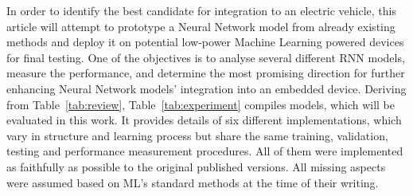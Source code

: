%
%
In order to identify the best candidate for integration to an electric vehicle, this article will attempt to prototype a Neural Network model from already existing methods and deploy it on potential low-power Machine Learning powered devices for final testing.
One of the objectives is to analyse several different RNN models, measure the performance, and determine the most promising direction for further enhancing Neural Network models' integration into an embedded device.
Deriving from \mbox{Table~\ref{tab:review}}, \mbox{Table~\ref{tab:experiment}} compiles models, which will be evaluated in this work.
It provides details of six different implementations, which vary in structure and learning process but share the same training, validation, testing and performance measurement procedures.
All of them were implemented as faithfully as possible to the original published versions.
All missing aspects were assumed based on ML's standard methods at the time of their writing.
